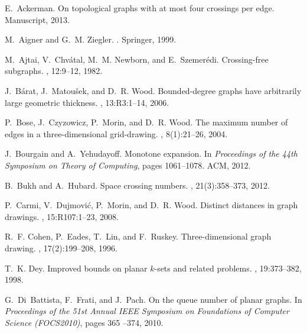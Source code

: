 \documentclass[12pt]{article}
\begin{document}
\begin{thebibliography}{10}

E.~Ackerman.
\newblock On topological graphs with at most four crossings per edge.
\newblock Manuscript, 2013.

M.~Aigner and G.~M. Ziegler.
.
\newblock Springer, 1999.

M.~Ajtai, V.~Chv\'atal, M.~M. Newborn, and E.~Szemer\'edi.
\newblock Crossing-free subgraphs.
, 12:9--12, 1982.

J.~B\'arat, J.~Matou{\v{s}}ek, and D.~R. Wood.
\newblock Bounded-degree graphs have arbitrarily large geometric thickness.
, 13:R3:1--14, 2006.

P.~Bose, J.~Czyzowicz, P.~Morin, and D.~R. Wood.
\newblock The maximum number of edges in a three-dimensional grid-drawing.
, 8(1):21--26,
  2004.

J.~Bourgain and A.~Yehudayoff.
\newblock Monotone expansion.
\newblock In {\em Proceedings of the 44th Symposium on Theory of Computing},
  pages 1061--1078. ACM, 2012.

B.~Bukh and A.~Hubard.
\newblock Space crossing numbers.
, 21(3):358--373, 2012.

P.~Carmi, V.~Dujmovi\'c, P.~Morin, and D.~R. Wood.
\newblock Distinct distances in graph drawings.
, 15:R107:1--23, 2008.

R.~F. Cohen, P.~Eades, T.~Lin, and F.~Ruskey.
\newblock Three-dimensional graph drawing.
, 17(2):199--208, 1996.

T.~K. Dey.
\newblock Improved bounds on planar $k$-sets and related problems.
, 19:373--382, 1998.

G.~Di~Battista, F.~Frati, and J.~Pach.
\newblock On the queue number of planar graphs.
\newblock In {\em Proceedings of the 51st Annual IEEE Symposium on Foundations
  of Computer Science (FOCS2010)}, pages 365 --374, 2010.


\end{thebibliography}
\end{document}
